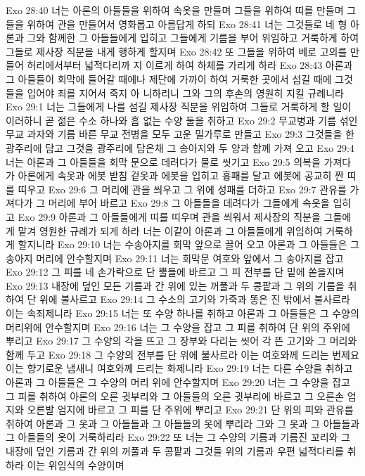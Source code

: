 Exo 28:40  너는 아론의 아들들을 위하여 속옷을 만들며 그들을 위하여 띠를 만들며 그들을 위하여 관을 만들어서 영화롭고 아름답게 하되
Exo 28:41  너는 그것들로 네 형 아론과 그와 함께한 그 아들들에게 입히고 그들에게 기름을 부어 위임하고 거룩하게 하여 그들로 제사장 직분을 내게 행하게 할지며
Exo 28:42  또 그들을 위하여 베로 고의를 만들어 허리에서부터 넓적다리까 지 이르게 하여 하체를 가리게 하라
Exo 28:43  아론과 그 아들들이 회막에 들어갈 때에나 제단에 가까이 하여 거룩한 곳에서 섬길 때에 그것들을 입어야 죄를 지어서 죽지 아 니하리니 그와 그의 후손의 영원히 지킬 규례니라
Exo 29:1  너는 그들에게 나를 섬길 제사장 직분을 위임하여 그들로 거룩하게 할 일이 이러하니 곧 젊은 수소 하나와 흠 없는 수양 둘을 취하고
Exo 29:2  무교병과 기름 섞인 무교 과자와 기름 바른 무교 전병을 모두 고운 밀가루로 만들고
Exo 29:3  그것들을 한 광주리에 담고 그것을 광주리에 담은채 그 송아지와 두 양과 함께 가져 오고
Exo 29:4  너는 아론과 그 아들들을 회막 문으로 데려다가 물로 씻기고
Exo 29:5  의복을 가져다가 아론에게 속옷과 에봇 받침 겉옷과 에봇을 입히고 흉패를 달고 에봇에 공교히 짠 띠를 띠우고
Exo 29:6  그 머리에 관을 씌우고 그 위에 성패를 더하고
Exo 29:7  관유를 가져다가 그 머리에 부어 바르고
Exo 29:8  그 아들들을 데려다가 그들에게 속옷을 입히고
Exo 29:9  아론과 그 아들들에게 띠를 띠우며 관을 씌워서 제사장의 직분을 그들에게 맡겨 영원한 규례가 되게 하라 너는 이같이 아론과 그 아들들에게 위임하여 거룩하게 할지니라
Exo 29:10  너는 수송아지를 회막 앞으로 끌어 오고 아론과 그 아들들은 그 송아지 머리에 안수할지며
Exo 29:11  너는 회막문 여호와 앞에서 그 송아지를 잡고
Exo 29:12  그 피를 네 손가락으로 단 뿔들에 바르고 그 피 전부를 단 밑에 쏟을지며
Exo 29:13  내장에 덮인 모든 기름과 간 위에 있는 꺼풀과 두 콩팥과 그 위의 기름을 취하여 단 위에 불사르고
Exo 29:14  그 수소의 고기와 가죽과 똥은 진 밖에서 불사르라 이는 속죄제니라
Exo 29:15  너는 또 수양 하나를 취하고 아론과 그 아들들은 그 수양의 머리위에 안수할지며
Exo 29:16  너는 그 수양을 잡고 그 피를 취하여 단 위의 주위에 뿌리고
Exo 29:17  그 수양의 각을 뜨고 그 장부와 다리는 씻어 각 뜬 고기와 그 머리와 함께 두고
Exo 29:18  그 수양의 전부를 단 위에 불사르라 이는 여호와께 드리는 번제요 이는 향기로운 냄새니 여호와께 드리는 화제니라
Exo 29:19  너는 다른 수양을 취하고 아론과 그 아들들은 그 수양의 머리 위에 안수할지며
Exo 29:20  너는 그 수양을 잡고 그 피를 취하여 아론의 오른 귓부리와 그 아들들의 오른 귓부리에 바르고 그 오른손 엄지와 오른발 엄지에 바르고 그 피를 단 주위에 뿌리고
Exo 29:21  단 위의 피와 관유를 취하여 아론과 그 옷과 그 아들들과 그 아들들의 옷에 뿌리라 그와 그 옷과 그 아들들과 그 아들들의 옷이 거룩하리라
Exo 29:22  또 너는 그 수양의 기름과 기름진 꼬리와 그 내장에 덮인 기름과 간 위의 꺼풀과 두 콩팥과 그것들 위의 기름과 우편 넓적다리를 취하라 이는 위임식의 수양이며
